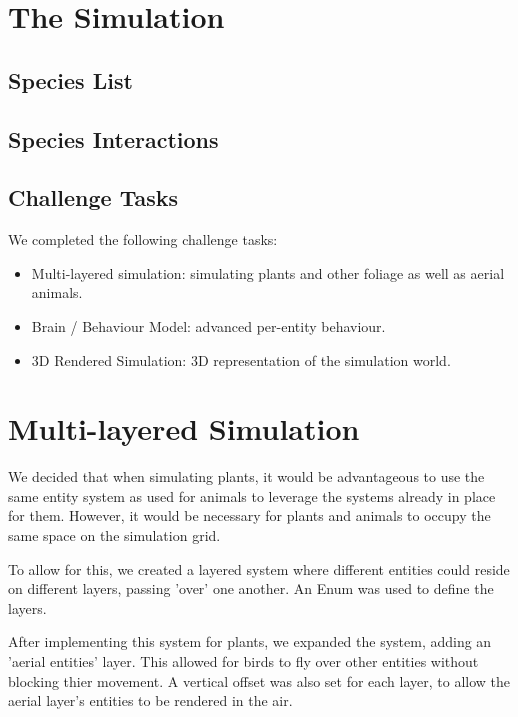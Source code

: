 \documentclass{article}
\begin{document}
    \begin{multicols}{2}
        \section{The Simulation}

        \subsection{Species List}

        \subsection{Species Interactions}
        
        \subsection{Challenge Tasks}

            We completed the following challenge tasks:

            \begin{itemize}
                \item Multi-layered simulation: simulating plants and other foliage as well as aerial animals.
                \item Brain / Behaviour Model: advanced per-entity behaviour.
                \item 3D Rendered Simulation: 3D representation of the simulation world.
            \end{itemize}

        \section{Multi-layered Simulation}
        We decided that when simulating plants, it would be advantageous to use the same entity system as used for animals to leverage the systems already in place for them. However, it would be necessary for plants and animals to occupy the same space on the simulation grid. 
        
        To allow for this, we created a layered system where different entities could reside on different layers, passing 'over' one another. An Enum was used to define the layers.
        
        After implementing this system for plants, we expanded the system, adding an 'aerial entities' layer. This allowed for birds to fly over other entities without blocking thier movement. A vertical offset was also set for each layer, to allow the aerial layer's entities to be rendered in the air.


\end{multicols}
\end{document}
